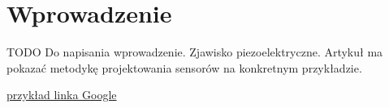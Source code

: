 \chapter{Wprowadzenie}
\label{sec:introduction}

TODO
Do napisania wprowadzenie. Zjawisko piezoelektryczne. Artykuł ma pokazać metodykę projektowania sensorów na konkretnym przykładzie.

\href{http://www.google.com}{przykład linka Google}